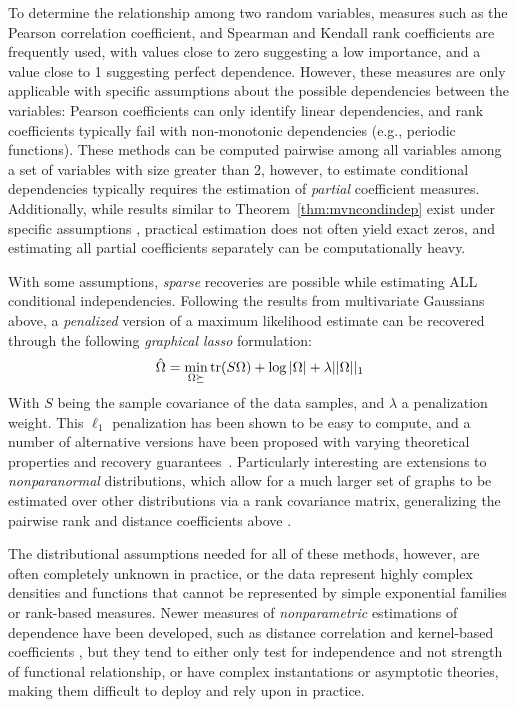To determine the relationship among two random variables, measures such as the Pearson correlation coefficient, and Spearman and Kendall rank coefficients \citep{abc} are frequently used, with values close to zero suggesting a low importance, and a value close to 1 suggesting perfect dependence. However,
these measures are only applicable with specific assumptions about the possible dependencies between the variables: Pearson coefficients can only identify linear dependencies, and rank coefficients typically fail with non-monotonic dependencies (e.g., periodic functions). These methods can be computed pairwise among all variables among a set of variables with size greater than 2, however, to estimate conditional dependencies typically requires the estimation of \textit{partial} coefficient measures.
Additionally, while results similar to Theorem~\ref{thm:mvncondindep} exist under specific assumptions ,
practical estimation does not often yield exact zeros,
and estimating all partial coefficients separately can be computationally heavy.

With some assumptions, \textit{sparse} recoveries are possible while estimating ALL conditional independencies. Following the results from multivariate Gaussians above,
a \textit{penalized} version of a maximum likelihood estimate can be recovered through the following \textit{graphical lasso} \cite{abc} formulation:
\begin{align}\label{eq:glasso}
    \hat{\Omega} = \min_{\Omega \succeq} \operatorname{tr}(S\Omega) + \log|\Omega| + \lambda||\Omega||_1
\end{align}
With $S$ being the sample covariance of the data samples, and $\lambda$ a penalization weight. This $\ell_1$ penalization has been shown to be easy to compute, and a number of alternative versions have been proposed with varying theoretical properties and recovery guarantees~\citep{abc}.
Particularly interesting are extensions to \textit{nonparanormal} distributions, which allow for a much larger set of graphs to be estimated over other distributions via a rank covariance matrix, generalizing the pairwise rank and distance coefficients above \cite{abc}.

The distributional assumptions needed for all of these methods, however, are often completely unknown in practice, or the data represent highly complex densities and functions that cannot be represented by simple exponential families or rank-based measures.
Newer measures of \textit{nonparametric} estimations of dependence have been developed, such as distance correlation and kernel-based coefficients \cite{abc}, but they tend to either only test for independence and not strength of functional relationship, or have complex instantations or asymptotic theories, making them difficult to deploy and rely upon in practice.

